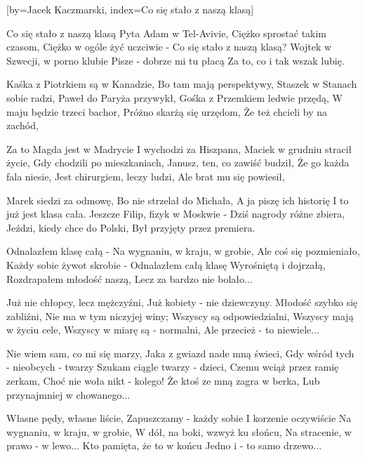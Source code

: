 [by={Jacek Kaczmarski},
                     index={Co się stało z naszą klasą}]
\beginverse

Co się stało z naszą klasą
Pyta Adam w Tel-Avivie,
Ciężko sprostać takim czasom,
Ciężko w ogóle żyć uczciwie -
Co się stało z naszą klasą?
Wojtek w Szwecji, w porno klubie
Pisze - dobrze mi tu płacą
Za to, co i tak wszak lubię.

\endverse
\beginverse

Kaśka z Piotrkiem są w Kanadzie,
Bo tam mają perspektywy,
Staszek w Stanach sobie radzi,
Paweł do Paryża przywykł,
Gośka z Przemkiem ledwie przędą,
W maju będzie trzeci bachor,
Próżno skarżą się urzędom,
Że też chcieli by na zachód,

\endverse
\beginverse

Za to Magda jest w Madrycie
I wychodzi za Hiszpana,
Maciek w grudniu stracił życie,
Gdy chodzili po mieszkaniach,
Janusz, ten, co zawiść budził,
Że go każda fala niesie,
Jest chirurgiem, leczy ludzi,
Ale brat mu się powiesił,

\endverse
\beginverse

Marek siedzi za odmowę,
Bo nie strzelał do Michała,
A ja piszę ich historię
I to już jest klasa cała.
Jeszcze Filip, fizyk w Moskwie -
Dziś nagrody różne zbiera,
Jeździ, kiedy chce do Polski,
Był przyjęty przez premiera.

\endverse
\beginverse

Odnalazłem klasę całą -
Na wygnaniu, w kraju, w grobie,
Ale coś się pozmieniało,
Każdy sobie żywot skrobie -
Odnalazłem całą klasę
Wyrośniętą i dojrzałą,
Rozdrapałem młodość naszą,
Lecz za bardzo nie bolało...

\endverse
\beginverse

Już nie chłopcy, lecz mężczyźni,
Już kobiety - nie dziewczyny.
Młodość szybko się zabliźni,
Nie ma w tym niczyjej winy;
Wszyscy są odpowiedzialni,
Wszyscy mają w życiu cele,
Wszyscy w miarę są - normalni,
Ale przecież - to niewiele...

\endverse
\beginverse

Nie wiem sam, co mi się marzy,
Jaka z gwiazd nade mną świeci,
Gdy wśród tych - nieobcych - twarzy
Szukam ciągle twarzy - dzieci,
Czemu wciąż przez ramię zerkam,
Choć nie woła nikt - kolego!
Że ktoś ze mną zagra w berka,
Lub przynajmniej w chowanego...

\endverse
\beginverse

Własne pędy, własne liście,
Zapuszczamy - każdy sobie
I korzenie oczywiście
Na wygnaniu, w kraju, w grobie,
W dół, na boki, wzwyż ku słońcu,
Na stracenie, w prawo - w lewo...
Kto pamięta, że to w końcu
Jedno i - to samo drzewo...

\endverse
\endsong